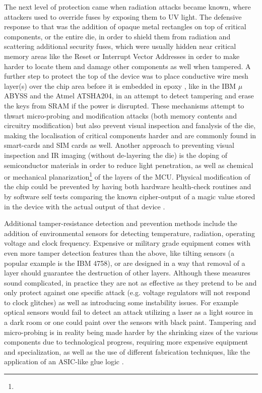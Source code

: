 The next level of protection came when radiation attacks became known\citep{sergei:thesis}, where attackers used to override fuses by exposing them to UV light. The defensive response to that was the addition of opaque metal rectangles on top of critical components, or the entire die, in order to shield them from radiation and scattering additional security fuses, which were usually hidden near critical memory areas like the Reset or Interrupt Vector Addresses in order to make harder to locate them and damage other components as well when tampered\citep{sergei:thesis}\citep{hwre}. A further step to protect the top of the device was to place conductive wire mesh layer(s) over the chip area before it is embedded in epoxy , like in the IBM $\mu$ABYSS \citep{website:ibm_secure} and the Atmel ATSHA204\citep{hwre}, in an attempt to detect tampering and erase the keys from SRAM if the power is disrupted. These mechanisms attempt to thwart micro-probing and modification attacks (both memory contents and circuitry modification)  but also prevent visual inspection and fanalysis of the die\citep{hwre}, making the localisation of critical components harder and are commonly found in smart-cards\citep{sergei:thesis} and SIM cards as well\citep{hwre}. Another approach to preventing visual inspection and IR imaging (without de-layering the die) is the doping of semiconductor materials in order to reduce light penetration\citep{sergei:thesis}, as well as chemical or mechanical planarization\footnote{} of the layers of the MCU\citep{sergei:thesis}. Physical modification of the chip could be prevented by having both hardware health-check routines and by software self tests comparing the known cipher-output of a magic value stored in the device with the actual output of that device \citep{anderson:tamper_resistance}.

Additional tamper-resistance detection and prevention methods include the addition of environmental sensors for detecting temperature, radiation, operating voltage and clock frequency\citep{sergei:thesis}. Expensive or military grade equipment comes with even more tamper detection features than the above, like tilting sensors (a popular example is the IBM 4758)\citep{website:ibm_secure}, or are designed in a way that removal of a layer should guarantee the destruction of other layers\citep{anderson:cautionary_note}. Although these measures sound complicated, in practice they are not as effective as they pretend to be and only protect against one specific attack (e.g. voltage regulators will not respond to clock glitches) as well as introducing some instability issues\citep{anderson:cautionary_note}. For example optical sensors would fail to detect an attack utilizing a laser as a light source in a dark room\citep{hwre} or one could paint over the sensors with black paint\citep{sergei:thesis}. Tampering and micro-probing is in reality being made harder by the shrinking sizes of the various components due to technological progress, requiring more expensive equipment and specialization, as well as the use of different fabrication techniques, like the application of an ASIC-like glue logic \citep{sergei:thesis}\citep{hwre}.